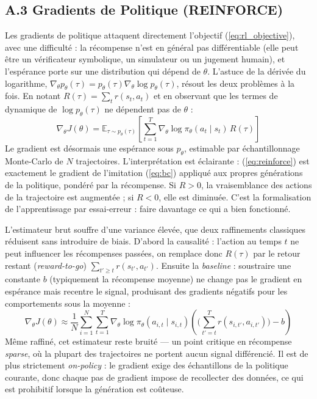 \documentclass[11pt,a4paper]{article}
\begin{document}
\subsection*{A.3 Gradients de Politique (REINFORCE)}
Les gradients de politique attaquent directement l'objectif (\ref{eq:rl_objective}), avec une difficulté : la récompense n'est en général pas différentiable (elle peut être un vérificateur symbolique, un simulateur ou un jugement humain), et l'espérance porte sur une distribution qui dépend de $\theta$. L'astuce de la dérivée du logarithme, $\nabla_\theta p_\theta(\tau) = p_\theta(\tau) \nabla_\theta \log p_\theta(\tau)$, résout les deux problèmes à la fois. En notant $R(\tau) = \sum_t r(s_t, a_t)$ et en observant que les termes de dynamique de $\log p_\theta(\tau)$ ne dépendent pas de $\theta$ :
\begin{equation}
\nabla_\theta J(\theta) = \mathbb{E}_{\tau \sim p_\theta(\tau)} \left[ \sum_{t=1}^{T} \nabla_\theta \log \pi_\theta(a_t \mid s_t) \, R(\tau) \right]
\label{eq:reinforce}
\end{equation}
Le gradient est désormais une espérance sous $p_\theta$, estimable par échantillonnage Monte-Carlo de $N$ trajectoires. L'interprétation est éclairante : (\ref{eq:reinforce}) est exactement le gradient de l'imitation (\ref{eq:bc}) appliqué aux propres générations de la politique, pondéré par la récompense. Si $R > 0$, la vraisemblance des actions de la trajectoire est augmentée ; si $R < 0$, elle est diminuée. C'est la formalisation de l'apprentissage par essai-erreur : faire davantage ce qui a bien fonctionné.

L'estimateur brut souffre d'une variance élevée, que deux raffinements classiques réduisent sans introduire de biais. D'abord la causalité : l'action au temps $t$ ne peut influencer les récompenses passées, on remplace donc $R(\tau)$ par le retour restant (\emph{reward-to-go}) $\sum_{t' \geq t} r(s_{t'}, a_{t'})$. Ensuite la \emph{baseline} : soustraire une constante $b$ (typiquement la récompense moyenne) ne change pas le gradient en espérance mais recentre le signal, produisant des gradients négatifs pour les comportements sous la moyenne :
\begin{equation}
\nabla_\theta J(\theta) \approx \frac{1}{N} \sum_{i=1}^{N} \sum_{t=1}^{T} \nabla_\theta \log \pi_\theta(a_{i,t} \mid s_{i,t}) \left( \Big( \sum_{t' = t}^{T} r(s_{i,t'}, a_{i,t'}) \Big) - b \right)
\label{eq:pg_baseline}
\end{equation}
Même raffiné, cet estimateur reste bruité — un point critique en récompense \emph{sparse}, où la plupart des trajectoires ne portent aucun signal différencié. Il est de plus strictement \emph{on-policy} : le gradient exige des échantillons de la politique courante, donc chaque pas de gradient impose de recollecter des données, ce qui est prohibitif lorsque la génération est coûteuse.
\end{document}
